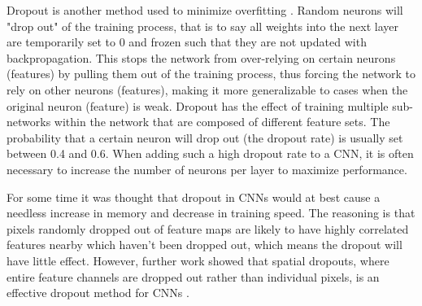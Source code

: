 Dropout is another method used to minimize overfitting \cite{Dropout}. Random neurons will "drop out" of the training process, that is to say all weights into the next layer are temporarily set to 0 and frozen such that they are not updated with backpropagation. This stops the network from over-relying on certain neurons (features) by pulling them out of the training process, thus forcing the network to rely on other neurons (features), making it more generalizable to cases when the original neuron (feature) is weak. Dropout has the effect of training multiple sub-networks within the network that are composed of different feature sets. The probability that a certain neuron will drop out (the dropout rate) is usually set between 0.4 and 0.6. When adding such a high dropout rate to a CNN, it is often necessary to increase the number of neurons per layer to maximize performance. 

For some time it was thought that dropout in CNNs would at best cause a needless increase in memory and decrease in training speed. The reasoning is that pixels randomly dropped out of feature maps are likely to have highly correlated features nearby which haven't been dropped out, which means the dropout will have little effect. However, further work showed that spatial dropouts, where entire feature channels are dropped out rather than individual pixels, is an effective dropout method for CNNs \cite{SpatialDropout}.